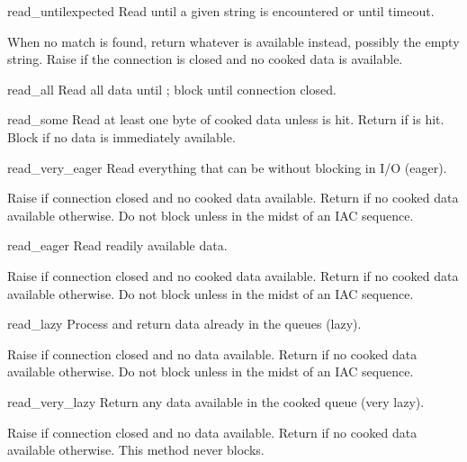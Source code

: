 \begin{methoddesc}{read_until}{expected}
Read until a given string is encountered or until timeout.

When no match is found, return whatever is available instead,
possibly the empty string.  Raise  if the connection
is closed and no cooked data is available.
\end{methoddesc}

\begin{methoddesc}{read_all}{}
Read all data until \EOF; block until connection closed.
\end{methoddesc}

\begin{methoddesc}{read_some}{}
Read at least one byte of cooked data unless \EOF{} is hit.
Return  if \EOF{} is hit.  Block if no data is immediately
available.
\end{methoddesc}

\begin{methoddesc}{read_very_eager}{}
Read everything that can be without blocking in I/O (eager).

Raise  if connection closed and no cooked data
available.  Return  if no cooked data available otherwise.
Do not block unless in the midst of an IAC sequence.
\end{methoddesc}

\begin{methoddesc}{read_eager}{}
Read readily available data.

Raise  if connection closed and no cooked data
available.  Return  if no cooked data available otherwise.
Do not block unless in the midst of an IAC sequence.
\end{methoddesc}

\begin{methoddesc}{read_lazy}{}
Process and return data already in the queues (lazy).

Raise  if connection closed and no data available.
Return  if no cooked data available otherwise.  Do not block
unless in the midst of an IAC sequence.
\end{methoddesc}

\begin{methoddesc}{read_very_lazy}{}
Return any data available in the cooked queue (very lazy).

Raise  if connection closed and no data available.
Return  if no cooked data available otherwise.  This method
never blocks.
\end{methoddesc}

